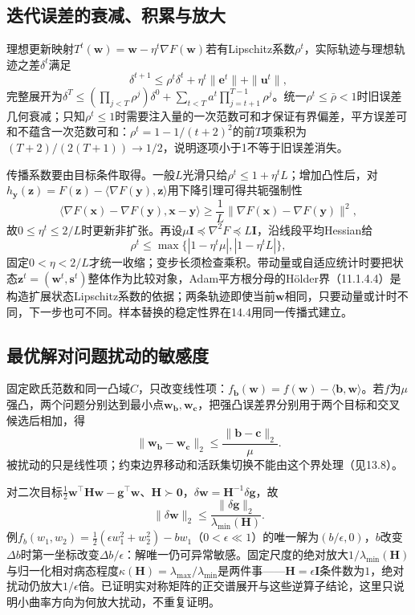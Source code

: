 \subsection{迭代误差的衰减、积累与放大}

理想更新映射$T^t(\bm w)=\bm w-\eta^t\nabla F(\bm w)$若有Lipschitz系数$\rho^t$，实际轨迹与理想轨迹之差$\delta^t$满足
\begin{equation}
 \delta^{t+1}\leq\rho^t\delta^t+\eta^t\|\bm e^t\|+\|\bm u^t\|,
 \label{eq:opt-inexact-gradient-recurrence}
\end{equation}
完整展开为$\delta^T\leq(\prod_{j<T}\rho^j)\delta^0+\sum_{t<T}a^t\prod_{j=t+1}^{T-1}\rho^j$。统一$\rho^t\leq\bar\rho<1$时旧误差几何衰减；只知$\rho^t\leq1$时需要注入量的一次范数可和才保证有界偏差，平方误差可和不蕴含一次范数可和：$\rho^t=1-1/(t+2)^2$的前$T$项乘积为$(T+2)/(2(T+1))\to1/2$，说明逐项小于1不等于旧误差消失。

传播系数要由目标条件取得。一般$L$光滑只给$\rho^t\leq1+\eta^tL$；增加凸性后，对$h_{\bm y}(\bm z)=F(\bm z)-\langle\nabla F(\bm y),\bm z\rangle$用下降引理可得共轭强制性
\[
 \langle\nabla F(\bm x)-\nabla F(\bm y),\bm x-\bm y\rangle
 \geq\frac1L\|\nabla F(\bm x)-\nabla F(\bm y)\|^2,
\]
故$0\leq\eta^t\leq2/L$时更新非扩张。再设$\mu\bm I\preceq\nabla^2F\preceq L\bm I$，沿线段平均Hessian给
\[
 \rho^t\leq\max\{|1-\eta^t\mu|,|1-\eta^tL|\},
\]
固定$0<\eta<2/L$才统一收缩；变步长须检查乘积。带动量或自适应统计时要把状态$\bm z^t=(\bm w^t,\bm s^t)$整体作为比较对象，Adam平方根分母的Hölder界（11.1.4.4）是构造扩展状态Lipschitz系数的依据；两条轨迹即使当前$\bm w$相同，只要动量或计时不同，下一步也可不同。样本替换的稳定性界在14.4用同一传播式建立。

\subsection{最优解对问题扰动的敏感度}

\label{sec:opt-solution-perturbation}%
固定欧氏范数和同一凸域$C$，只改变线性项：$f_{\bm b}(\bm w)=f(\bm w)-\langle\bm b,\bm w\rangle$。若$f$为$\mu$强凸，两个问题分别达到最小点$\bm w_{\bm b},\bm w_{\bm c}$，把强凸误差界分别用于两个目标和交叉候选后相加，得
\[
 \|\bm w_{\bm b}-\bm w_{\bm c}\|_2
 \leq\frac{\|\bm b-\bm c\|_2}{\mu}.
\]
被扰动的只是线性项；约束边界移动和活跃集切换不能由这个界处理（见13.8）。

对二次目标$\frac12\bm w^\top\bm H\bm w-\bm g^\top\bm w$、$\bm H\succ\bm0$，$\delta\bm w=\bm H^{-1}\delta\bm g$，故
\[
 \|\delta\bm w\|_2\leq\frac{\|\delta\bm g\|_2}{\lambda_{\min}(\bm H)}.
\]
例$f_b(w_1,w_2)=\frac12(\epsilon w_1^2+w_2^2)-bw_1$（$0<\epsilon\ll1$）的唯一解为$(b/\epsilon,0)$，$b$改变$\Delta b$时第一坐标改变$\Delta b/\epsilon$：解唯一仍可异常敏感。固定尺度的绝对放大$1/\lambda_{\min}(\bm H)$与归一化相对病态程度$\kappa(\bm H)=\lambda_{\max}/\lambda_{\min}$是两件事——$\bm H=\epsilon\bm I$条件数为$1$，绝对扰动仍放大$1/\epsilon$倍。已证明实对称矩阵的正交谱展开与这些逆算子结论，这里只说明小曲率方向为何放大扰动，不重复证明。

